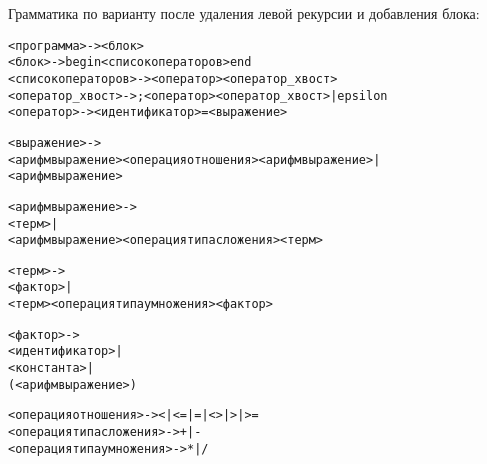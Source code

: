 Грамматика по варианту после удаления левой рекурсии и добавления блока:

\begin{framed}
\ttfamily 
\begin{alltt}
<программа> -> <блок>
<блок> -> begin <список операторов> end
<список операторов> -> <оператор> <оператор_хвост>
<оператор_хвост> -> ; <оператор> <оператор_хвост> | epsilon
<оператор> -> <идентификатор> = <выражение>

<выражение> -> 
    <арифм выражение> <операция отношения> <арифм выражение> | 
    <арифм выражение> 

<арифм выражение> -> 
    <терм> | 
    <арифм выражение> <операция типа сложения> <терм>   

<терм> -> 
    <фактор> | 
    <терм> <операция типа умножения> <фактор>

<фактор> -> 
    <идентификатор> | 
    <константа> | 
    ( <арифм выражение> )

<операция отношения> -> < | <= | = | <> | > | >= 
<операция типа сложения> -> + | - 
<операция типа умножения> -> * | / 
\end{alltt}
\end{framed}

\newpage